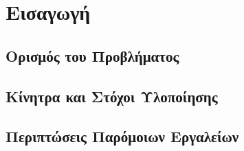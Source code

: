 \chapter{Εισαγωγή}
\section{Ορισμός του Προβλήματος}

\section{Κίνητρα και Στόχοι Υλοποίησης}

\section{Περιπτώσεις Παρόμοιων Εργαλείων}
